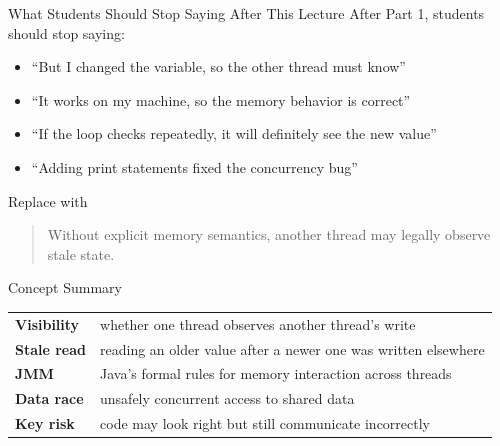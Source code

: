 \documentclass[aspectratio=169,11pt]{beamer}
\begin{document}
	\begin{frame}{What Students Should Stop Saying After This Lecture}
		After Part 1, students should stop saying:
		
		\begin{itemize}
			\item ``But I changed the variable, so the other thread must know''
			\item ``It works on my machine, so the memory behavior is correct''
			\item ``If the loop checks repeatedly, it will definitely see the new value''
			\item ``Adding print statements fixed the concurrency bug''
		\end{itemize}
		
		\vspace{0.35cm}
		
		\begin{alertblock}{Replace with}
			\begin{quote}
				Without explicit memory semantics, another thread may legally observe stale state.
			\end{quote}
		\end{alertblock}
	\end{frame}
	
	\begin{frame}{Concept Summary}
		\centering
		\begin{tabular}{>{\bfseries}m{3cm} m{7.5cm}}
			Visibility & whether one thread observes another thread's write \\
			Stale read & reading an older value after a newer one was written elsewhere \\
			JMM & Java's formal rules for memory interaction across threads \\
			Data race & unsafely concurrent access to shared data \\
			Key risk & code may look right but still communicate incorrectly \\
		\end{tabular}
	\end{frame}
	
\end{document}
